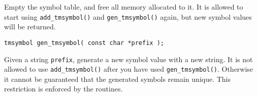 \begin{desc}
Empty the symbol table, and free all memory allocated to it.
It is allowed to start using \verb+add_tmsymbol()+
and \verb+gen_tmsymbol()+ again,
but new symbol values will be returned.
\end{desc}
\begin{verbatim}
tmsymbol gen_tmsymbol( const char *prefix );
\end{verbatim}
\begin{desc}
Given a string {\tt prefix}, generate a new symbol value with a new string.
It is not allowed to use \verb+add_tmsymbol()+ after you have used
\verb+gen_tmsymbol()+.
Otherwise it cannot be guaranteed that the generated symbols remain unique.
This restriction is enforced by the routines.
\end{desc}
